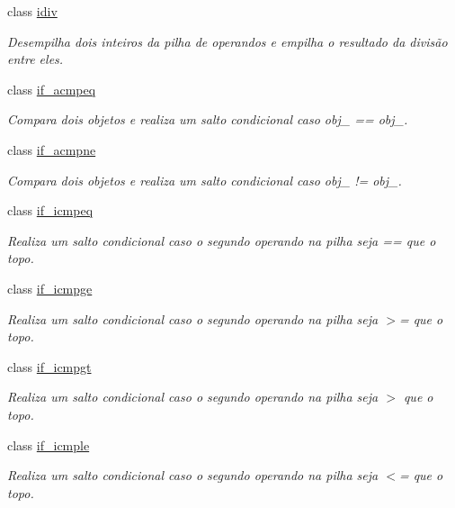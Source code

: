 \begin{DoxyCompactItemize}
class \hyperlink{class_instruction_impl_1_1idiv}{idiv}
\begin{DoxyCompactList}\small\item\em Desempilha dois inteiros da pilha de operandos e empilha o resultado da divisão entre eles. \end{DoxyCompactList}\item 
class \hyperlink{class_instruction_impl_1_1if__acmpeq}{if\+\_\+acmpeq}
\begin{DoxyCompactList}\small\item\em Compara dois objetos e realiza um salto condicional caso obj\+\_ == obj\+\_. \end{DoxyCompactList}\item 
class \hyperlink{class_instruction_impl_1_1if__acmpne}{if\+\_\+acmpne}
\begin{DoxyCompactList}\small\item\em Compara dois objetos e realiza um salto condicional caso obj\+\_ != obj\+\_. \end{DoxyCompactList}\item 
class \hyperlink{class_instruction_impl_1_1if__icmpeq}{if\+\_\+icmpeq}
\begin{DoxyCompactList}\small\item\em Realiza um salto condicional caso o segundo operando na pilha seja == que o topo. \end{DoxyCompactList}\item 
class \hyperlink{class_instruction_impl_1_1if__icmpge}{if\+\_\+icmpge}
\begin{DoxyCompactList}\small\item\em Realiza um salto condicional caso o segundo operando na pilha seja $>$= que o topo. \end{DoxyCompactList}\item 
class \hyperlink{class_instruction_impl_1_1if__icmpgt}{if\+\_\+icmpgt}
\begin{DoxyCompactList}\small\item\em Realiza um salto condicional caso o segundo operando na pilha seja $>$ que o topo. \end{DoxyCompactList}\item 
class \hyperlink{class_instruction_impl_1_1if__icmple}{if\+\_\+icmple}
\begin{DoxyCompactList}\small\item\em Realiza um salto condicional caso o segundo operando na pilha seja $<$= que o topo. \end{DoxyCompactList}\item 

\end{DoxyCompactItemize}
